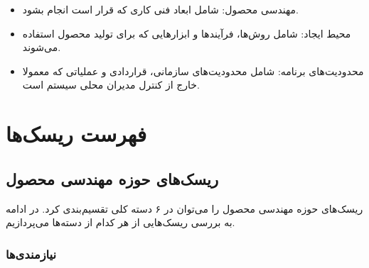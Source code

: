 \begin{itemize}
	\item
	 مهندسی محصول: شامل ابعاد فنی کاری که قرار است انجام بشود.
	
	\item
	 محیط ایجاد: شامل روش‌ها، فرآیندها و ابزارهایی که برای تولید محصول استفاده می‌شوند.
	
	\item
	 محدودیت‌های برنامه: شامل محدودیت‌های سازمانی، قراردادی و عملیاتی که معمولا خارج از کنترل مدیران محلی سیستم است.
\end{itemize}

\section{فهرست ریسک‌ها}

\subsection{ریسک‌های حوزه مهندسی محصول}

ریسک‌های حوزه مهندسی محصول را می‌توان در ۶ دسته کلی تقسیم‌بندی کرد. در ادامه به بررسی ریسک‌هایی از هر کدام از دسته‌ها می‌پردازیم.


\subsubsection{نیازمندی‌ها}

